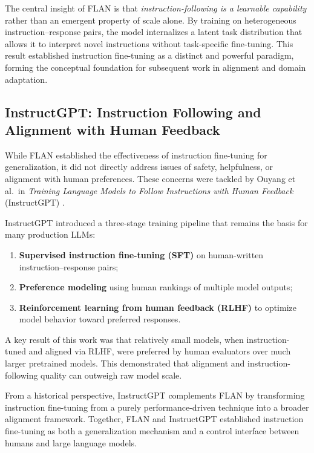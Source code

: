 \documentclass[unnumsec,webpdf,contemporary,large]{oup-authoring-template}
\theoremstyle{thmstyleone}
\theoremstyle{thmstyletwo}
\theoremstyle{thmstylethree}
\begin{document}
The central insight of FLAN is that \emph{instruction-following is a learnable capability} rather than an emergent property of scale alone. By training on heterogeneous instruction--response pairs, the model internalizes a latent task distribution that allows it to interpret novel instructions without task-specific fine-tuning. This result established instruction fine-tuning as a distinct and powerful paradigm, forming the conceptual foundation for subsequent work in alignment and domain adaptation.

\subsection{InstructGPT: Instruction Following and Alignment with Human Feedback}

While FLAN established the effectiveness of instruction fine-tuning for generalization, it did not directly address issues of safety, helpfulness, or alignment with human preferences. These concerns were tackled by Ouyang et al.\ in \emph{Training Language Models to Follow Instructions with Human Feedback} (InstructGPT) \cite{ouyang2022instructgpt}.

InstructGPT introduced a three-stage training pipeline that remains the basis for many production LLMs:
\begin{enumerate}
  \item \textbf{Supervised instruction fine-tuning (SFT)} on human-written instruction--response pairs;
  \item \textbf{Preference modeling} using human rankings of multiple model outputs;
  \item \textbf{Reinforcement learning from human feedback (RLHF)} to optimize model behavior toward preferred responses.
\end{enumerate}

A key result of this work was that relatively small models, when instruction-tuned and aligned via RLHF, were preferred by human evaluators over much larger pretrained models. This demonstrated that alignment and instruction-following quality can outweigh raw model scale.

From a historical perspective, InstructGPT complements FLAN by transforming instruction fine-tuning from a purely performance-driven technique into a broader alignment framework. Together, FLAN and InstructGPT established instruction fine-tuning as both a generalization mechanism and a control interface between humans and large language models.
\end{document}

